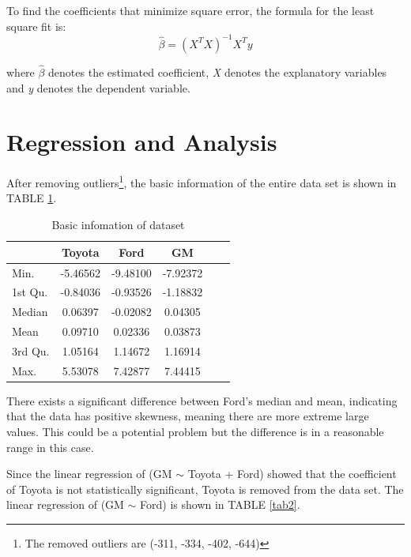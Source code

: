 \documentclass[11pt, conference]{IEEEtran}
\begin{document}
To find the coefficients that minimize square error, the formula for the least square fit is:
$$ \hat{\beta} = (X^{T}X)^{-1}X^{T}y $$

where $\hat{\beta}$ denotes the estimated coefficient, \emph{X} denotes the explanatory variables and \emph{y} denotes the dependent variable. 


\section{Regression and Analysis}
After removing outliers\footnote{The removed outliers are (-311, -334, -402, -644)},  the basic information of the entire data set is shown in TABLE \ref{tab1}.

\begin{table}[!h]
\centering
\caption{Basic infomation of dataset}
\label{tab1}
\begin{tabular}{lc c c cl}
\hline
      &  Toyota   & Ford     & GM       \\
\hline
Min.    & -5.46562 & -9.48100 & -7.92372 \\
1st Qu. & -0.84036 & -0.93526 & -1.18832 \\
Median  & 0.06397  & -0.02082 & 0.04305  \\
Mean    & 0.09710  & 0.02336  & 0.03873  \\
3rd Qu. & 1.05164  & 1.14672  & 1.16914  \\
Max.    & 5.53078  & 7.42877  & 7.44415 \\
\hline
\end{tabular}
\end{table}

There exists a significant difference between Ford’s median and mean, indicating that the data has positive skewness, meaning there are more extreme large values. This could be a potential problem but the difference is in a reasonable range in this case. 

Since the linear regression of (GM $\sim$ Toyota + Ford) showed that the coefficient of Toyota is not statistically significant, Toyota is removed from the data set. The linear regression of (GM $\sim$ Ford) is shown in TABLE \ref{tab2}.
\end{document}
